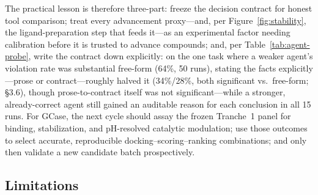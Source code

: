 \documentclass{article}
\begin{document}
The practical lesson is therefore three-part: freeze the decision contract for honest tool comparison; treat every advancement proxy---and, per Figure~\ref{fig:stability}, the ligand-preparation step that feeds it---as an experimental factor needing calibration before it is trusted to advance compounds; and, per Table~\ref{tab:agent-probe}, write the contract down explicitly: on the one task where a weaker agent's violation rate was substantial free-form (64\%, 50 runs), stating the facts explicitly---prose or contract---roughly halved it (34\%/28\%, both significant vs.\ free-form; \S3.6), though prose-to-contract itself was not significant---while a stronger, already-correct agent still gained an auditable reason for each conclusion in all 15 runs. For GCase, the next cycle should assay the frozen Tranche~1 panel for binding, stabilization, and pH-resolved catalytic modulation; use those outcomes to select accurate, reproducible docking--scoring--ranking combinations; and only then validate a new candidate batch prospectively.

\subsection{Limitations}
\end{document}
